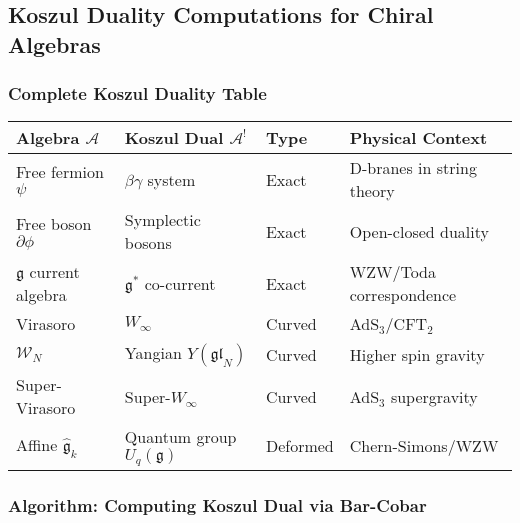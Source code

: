 \subsection{Koszul Duality Computations for Chiral Algebras}

\subsubsection{Complete Koszul Duality Table}

\begin{center}
\begin{tabular}{|l|l|l|l|}
\hline
\textbf{Algebra $\mathcal{A}$} & \textbf{Koszul Dual $\mathcal{A}^!$} & \textbf{Type} & \textbf{Physical Context} \\
\hline
Free fermion $\psi$ & $\beta\gamma$ system & Exact & D-branes in string theory \\
Free boson $\partial\phi$ & Symplectic bosons & Exact & Open-closed duality \\
$\mathfrak{g}$ current algebra & $\mathfrak{g}^*$ co-current & Exact & WZW/Toda correspondence \\
Virasoro & $W_\infty$ & Curved & AdS$_3$/CFT$_2$ \\
$\mathcal{W}_N$ & Yangian $Y(\mathfrak{gl}_N)$ & Curved & Higher spin gravity \\
Super-Virasoro & Super-$W_\infty$ & Curved & AdS$_3$ supergravity \\
Affine $\hat{\mathfrak{g}}_k$ & Quantum group $U_q(\mathfrak{g})$ & Deformed & Chern-Simons/WZW \\
\hline
\end{tabular}
\end{center}

\subsubsection{Algorithm: Computing Koszul Dual via Bar-Cobar}

